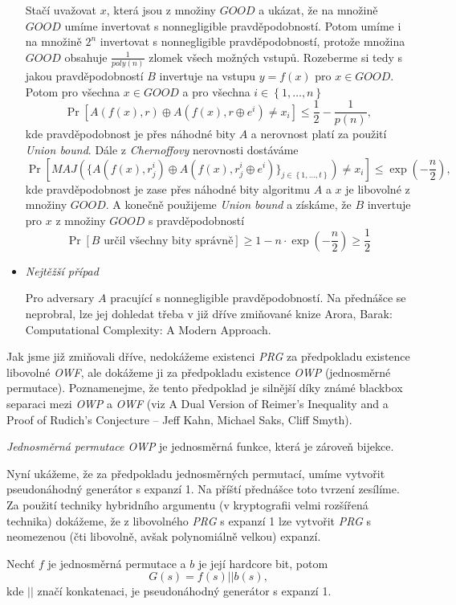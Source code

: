 \documentclass[a4paper,12pt,titlepage]{article}
\def\definice{\noindent {\bf Definice: }}
\def\tvrzeni{\noindent {\bf Tvrzení: }}
\begin{document}
\begin{itemize}
		Stačí uvažovat $x$, která jsou z množiny $GOOD$ a ukázat, že na množině $GOOD$ umíme invertovat s nonnegligible pravděpodobností.
		Potom umíme i na množině $2^n$ invertovat s nonnegligible pravděpodobností, protože množina $GOOD$ obsahuje $\frac{1}{poly(n)}$ zlomek všech možných vstupů.
		Rozeberme si tedy s jakou pravděpodobností $B$ invertuje na vstupu $y=f(x)$ pro $x \in GOOD$.
		Potom pro všechna $x \in GOOD$ a pro všechna $i \in \left\{ 1,\ldots , n \right\}$
		$$
		\Pr[A(f(x),r) \oplus A(f(x),r\oplus e^i) \neq x_i] \leq \frac{1}{2}-\frac{1}{p(n)},
		$$
		kde pravděpodobnost je přes náhodné bity $A$ a nerovnost platí za použití \emph{Union bound}.
		Dále z \emph{Chernoffovy} nerovnosti dostáváme  
		$$
		\Pr[MAJ( \{A(f(x),r^i_j) \oplus A(f(x),r^i_j\oplus e^i)\}_{j \in \left\{ 1, \ldots , t \right\}}) \neq x_i] \leq \exp(-\frac{n}{2}),
		$$
		kde pravděpodobnost je zase přes náhodné bity algoritmu $A$ a $x$ je libovolné z množiny $GOOD$.
		A konečně použijeme \emph{Union bound} a získáme, že $B$ invertuje pro $x$ z množiny $GOOD$ s pravděpodobností
		$$
		\Pr[B \text{ určil všechny bity správně}] \geq 1 - n\cdot \exp(-\frac{n}{2}) \geq \frac{1}{2}
		$$
	\item \emph{Nejtěžší případ}

		Pro adversary $A$ pracující s nonnegligible pravděpodobností.
		Na přednášce se neprobral, lze jej dohledat třeba v již dříve zmiňované knize Arora, Barak: Computational Complexity: A Modern Approach.
\end{itemize}


Jak jsme již zmiňovali dříve, nedokážeme existenci \emph{PRG} za předpokladu existence libovolné \emph{OWF}, ale dokážeme ji za předpokladu existence \emph{OWP} (jednosměrné permutace).
Poznamenejme, že tento předpoklad je silnější díky známé blackbox separaci mezi \emph{OWP} a \emph{OWF} (viz A Dual Version of Reimer’s Inequality and a Proof of Rudich’s Conjecture -- Jeff Kahn, Michael Saks, Cliff Smyth).

\definice \emph{Jednosměrná permutace OWP} je jednosměrná funkce, která je zároveň bijekce.

Nyní ukážeme, že za předpokladu jednosměrných permutací, umíme vytvořit pseudonáhodný generátor s expanzí 1.
Na příští přednášce toto tvrzení zesílíme.
Za použití techniky hybridního argumentu (v kryptografii velmi rozšířená technika) dokážeme, že z libovolného \emph{PRG} s expanzí 1 lze vytvořit \emph{PRG} s neomezenou (čti libovolně, avšak polynomiálně velkou) expanzí.

\tvrzeni Nechť $f$ je jednosměrná permutace a $b$ je její hardcore bit, potom
$$
G(s) = f(s)||b(s),
$$
kde $||$ značí konkatenaci, je pseudonáhodný generátor s expanzí 1.
\end{document}
